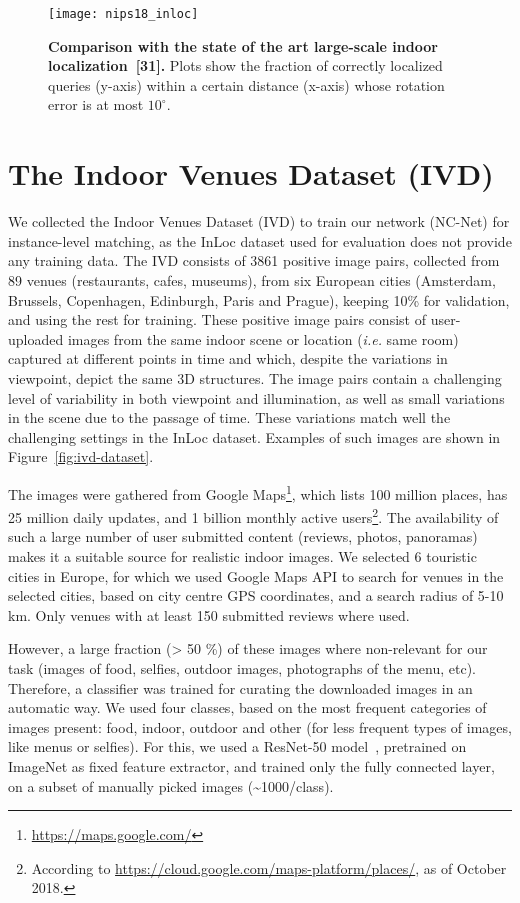 \documentclass{article}
\begin{document}
\begin{figure}[t]
    \centering
    \texttt{[image: nips18\_inloc]}
    \caption{{\bf Comparison with the state of the art large-scale indoor localization~[31].} Plots show the fraction of correctly localized queries (y-axis) within a certain distance (x-axis) whose rotation error is at most  $10^{\circ}$. }
    \label{fig:inloc-curves}
\end{figure}


\section{The Indoor Venues Dataset (IVD)\label{apx:indoor_venues_dataset}}
We collected the Indoor Venues Dataset (IVD) to train our network (NC-Net) for instance-level matching, as the InLoc \cite{Taira18} dataset
 used for evaluation does not provide any training data. 
The IVD consists of 3861 positive image pairs, collected from 89 venues (restaurants, cafes, museums), from six European cities (Amsterdam, Brussels, Copenhagen, Edinburgh, Paris and Prague), keeping 10\% for validation, and using the rest for training.
These positive image pairs consist of user-uploaded images
from the same indoor scene or location (\emph{i.e.} same room) captured at different points in time and which, despite the variations in viewpoint, depict the same 3D structures.  The image pairs contain a challenging level of variability in both viewpoint and illumination, as well as small variations in the scene due to the passage of time. These variations match well the challenging settings in the InLoc dataset. Examples of such images are shown in Figure~\ref{fig:ivd-dataset}.

The images were gathered from Google Maps\footnote{\url{https://maps.google.com/}}, which lists 100 million places, has 25 million daily updates, and 1 billion monthly active users\footnote{According to \url{https://cloud.google.com/maps-platform/places/}, as of October 2018.}. The availability of such a large number of user submitted content (reviews, photos, panoramas) makes it a suitable source for realistic indoor images.
We selected 6 touristic cities in Europe, for which we used Google Maps API 
to search for venues in the selected cities, based on city centre GPS coordinates, and a search radius of 5-10 km. Only venues with at least 150 submitted reviews where used.

However, a large fraction (> 50 \%) 
of these images where non-relevant for our task (images of food, selfies, outdoor images, photographs of the menu, etc). Therefore, a classifier was trained for curating the downloaded images in an automatic way. We used four classes, based on the most frequent categories of images present: food, indoor, outdoor and other (for less frequent types of images, like menus or selfies). For this, we used a ResNet-50 model~\cite{he2016deep}, pretrained on ImageNet as fixed feature extractor, and trained only the fully connected layer, on a subset of manually picked images (\textasciitilde{}1000/class). 
\end{document}

